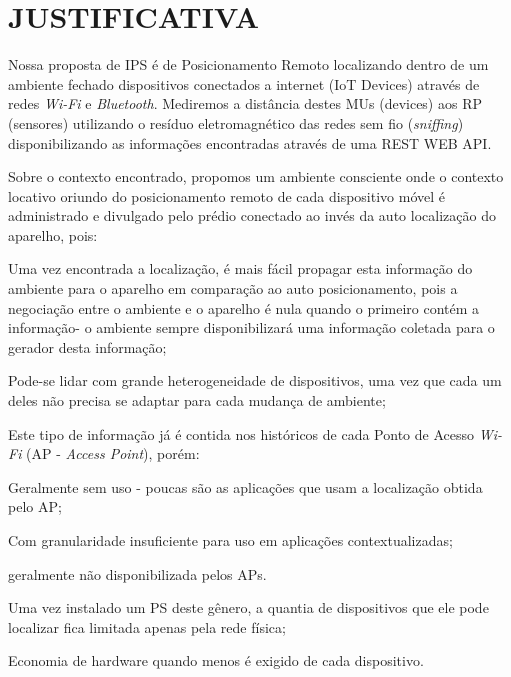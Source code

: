 \chapter{JUSTIFICATIVA}
\label{chap:JUSTIFICATIVA}

Nossa proposta de IPS é de Posicionamento Remoto localizando dentro de um
ambiente fechado dispositivos conectados a internet (IoT Devices) através de
redes \textit{Wi-Fi} e \textit{Bluetooth}. Mediremos a distância destes MUs (devices) aos RP
(sensores) utilizando o resíduo eletromagnético das redes sem fio
(\textit{sniffing}) disponibilizando as informações encontradas através de uma
REST WEB API.

Sobre o contexto encontrado, propomos um ambiente consciente onde o contexto
locativo oriundo do posicionamento remoto de cada dispositivo móvel é
administrado e divulgado pelo prédio conectado ao invés da auto localização do
aparelho, pois:

\begin{alineas}

	\item Uma vez encontrada a localização, é mais fácil propagar esta informação do
ambiente para o aparelho em comparação ao auto posicionamento, pois a negociação
entre o ambiente e o aparelho é nula quando o primeiro contém a informação- o
ambiente sempre disponibilizará uma informação coletada para o gerador desta
informação;

	\item Pode-se lidar com grande heterogeneidade de dispositivos, uma vez
que cada um deles não precisa se adaptar para cada mudança de ambiente;

	\item Este tipo de informação já é contida nos históricos de cada Ponto de
	Acesso 	\textit{Wi-Fi} (AP - \textit{Access Point}), porém:

	\begin{alineas}

		\item Geralmente sem uso - poucas são as aplicações que usam a
		localização obtida pelo AP;

		\item Com granularidade insuficiente para uso em aplicações
		contextualizadas;

		\item geralmente não disponibilizada pelos APs.

	\end{alineas}

	\item Uma vez instalado um PS deste gênero, a quantia de dispositivos que
	ele pode localizar fica limitada apenas pela rede física;

	\item Economia de hardware quando menos é exigido de cada dispositivo.

\end{alineas}

